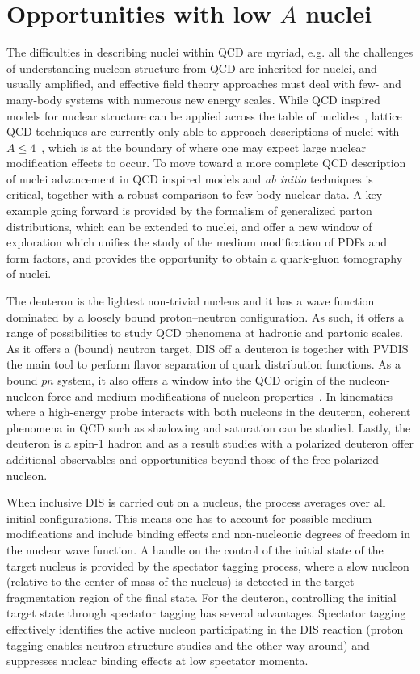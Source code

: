 \section{Opportunities with low $\mathit{A}$ nuclei\label{sec:light}}
%
The difficulties in describing nuclei within QCD are myriad, e.g. all the challenges of understanding nucleon structure from QCD are inherited for nuclei, and usually amplified, and effective field theory approaches must deal with few- and many-body systems with numerous new energy scales. While QCD inspired models for nuclear structure can be applied across the table of nuclides~\cite{Cloet:2006bq,Cloet:2015tha,Stone:2017oqt,Stone:2016qmi}, lattice QCD techniques are currently only able to approach descriptions of nuclei with $A \leq 4$~\cite{Chang:2015qxa}, which is at the boundary of where one may expect large nuclear modification effects to occur. To move toward a more complete QCD description of nuclei advancement in QCD inspired models and {\it ab initio} techniques is critical, together with a robust comparison to few-body nuclear data. A key example going forward is provided by the formalism of generalized parton distributions, which can be extended to nuclei, and offer a new window of exploration which unifies the study of the medium modification of PDFs and form factors, and provides the opportunity to obtain a quark-gluon tomography of nuclei. 

The deuteron is the lightest non-trivial nucleus and it has a wave function dominated by a loosely bound proton--neutron configuration.  As such, it offers a range of possibilities to study QCD phenomena at hadronic and partonic scales.  As it offers a (bound) neutron target, DIS off a deuteron is together with PVDIS the main tool to perform flavor separation of quark distribution functions.  As a bound $pn$ system, it also offers a window into the QCD origin of the nucleon-nucleon force and medium modifications of nucleon properties~\cite{Boeglin:2015cha}.  In kinematics where a high-energy probe interacts with both nucleons in the deuteron, coherent phenomena in QCD such as shadowing and saturation can be studied.  Lastly, the deuteron is a spin-1 hadron and as a result studies with a polarized deuteron offer additional observables and opportunities beyond those of the free polarized nucleon.

When inclusive DIS is carried out on a nucleus, the process averages over all initial configurations.  This means one has to account for possible medium modifications and include binding effects and non-nucleonic degrees of freedom in the nuclear wave function.  A handle on the control of the initial state of the target nucleus is provided by the spectator tagging process, where a slow nucleon (relative to the center of mass of the nucleus) is detected in the target fragmentation region of the final state.  For the deuteron, controlling the initial target state through spectator tagging has several advantages.  Spectator tagging effectively identifies the active nucleon participating in the DIS reaction (proton tagging enables neutron structure studies and the other way around) and suppresses nuclear binding effects at low spectator momenta. 

